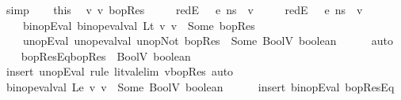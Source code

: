 \begin{isabellebody}
\ simp\isanewline
\ \ \isamarkupfalse%
\ this\ \isamarkupfalse%
\ v{}\ v{}\ bopRes\ \isanewline
\ \ \ \ redE{}{\isacharcolon}{\kern0pt}\ {\isachardoublequoteopen}{\isasymLambda}{\isacharcomma}{\kern0pt}{\isasymGamma}{\isacharcomma}{\kern0pt}{\isasymOmega}\ {\isasymturnstile}\ {\isasymlangle}e{}{\isacharcomma}{\kern0pt}\ ns{\isasymrangle}\ {\isasymDown}\ v{}{\isachardoublequoteclose}\ \isanewline
\ \ \ \ redE{}{\isacharcolon}{\kern0pt}\ {\isachardoublequoteopen}{\isasymLambda}{\isacharcomma}{\kern0pt}{\isasymGamma}{\isacharcomma}{\kern0pt}{\isasymOmega}\ {\isasymturnstile}\ {\isasymlangle}e{}{\isacharcomma}{\kern0pt}\ ns{\isasymrangle}\ {\isasymDown}\ v{}{\isachardoublequoteclose}\ \isanewline
\ \ \ \ binopEval{\isacharcolon}{\kern0pt}\ {\isachardoublequoteopen}binop{\isacharunderscore}{\kern0pt}eval{\isacharunderscore}{\kern0pt}val\ Lt\ v{}\ v{}\ {\isacharequal}{\kern0pt}\ Some\ bopRes{\isachardoublequoteclose}\ \isanewline
\ \ \ \ unopEval{\isacharcolon}{\kern0pt}\ {\isachardoublequoteopen}unop{\isacharunderscore}{\kern0pt}eval{\isacharunderscore}{\kern0pt}val\ unop{\isachardot}{\kern0pt}Not\ bopRes\ {\isacharequal}{\kern0pt}\ Some\ {\isacharparenleft}{\kern0pt}BoolV\ boolean{\isacharparenright}{\kern0pt}{\isachardoublequoteclose}\isanewline
\ \ \ \ \isamarkupfalse%
\ auto\isanewline
\isanewline
\ \ \isamarkupfalse%
\ bopResEq{\isacharcolon}{\kern0pt}{\isachardoublequoteopen}bopRes\ {\isacharequal}{\kern0pt}\ BoolV\ {\isacharparenleft}{\kern0pt}{\isasymnot}boolean{\isacharparenright}{\kern0pt}{\isachardoublequoteclose}\ \ \ \ \ \isanewline
\ \ \ \ \isamarkupfalse%
\ {\isacharparenleft}{\kern0pt}insert\ unopEval{\isacharcomma}{\kern0pt}\ rule\ lit{\isacharunderscore}{\kern0pt}val{\isacharunderscore}{\kern0pt}elim{\isacharbrackleft}{\kern0pt}\ v{\isacharequal}{\kern0pt}bopRes{\isacharbrackright}{\kern0pt}{\isacharparenright}{\kern0pt}\ auto\isanewline
\isanewline
\ \ \isamarkupfalse%
\ {\isachardoublequoteopen}binop{\isacharunderscore}{\kern0pt}eval{\isacharunderscore}{\kern0pt}val\ Le\ v{}\ v{}\ {\isacharequal}{\kern0pt}\ Some\ {\isacharparenleft}{\kern0pt}BoolV\ boolean{\isacharparenright}{\kern0pt}{\isachardoublequoteclose}\isanewline
\ \ \ \ \isamarkupfalse%
\ {\isacharparenleft}{\kern0pt}insert\ binopEval\ bopResEq{\isacharparenright}{\kern0pt}\isanewline

\end{isabellebody}
